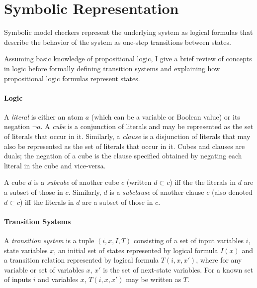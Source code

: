 \documentclass[12pt,a4paper,twoside,openright]{report}
\begin{document}
{\section{Symbolic Representation}
\label{prep:logic}

Symbolic model checkers represent the underlying system as
logical formulas that describe the behavior of the system as one-step transitions
between states. %

Assuming basic knowledge of propositional logic,
I give a brief review of concepts in logic before formally defining transition systems
and explaining how propositional logic formulas represent states.

\paragraph{Logic}{
A \emph{literal} is either an atom $a$ (which can
be a variable or Boolean value) or its negation $\neg a$.
A \emph{cube} is a conjunction of literals and may be represented as the set
of literals that occur in it. Similarly, a \emph{clause} is a disjunction of literals that
may also be represented as the set of literals that occur in it.
Cubes and clauses are duals; the negation of a cube is the
clause specified obtained by negating each literal in the cube
and vice-versa.

A cube $d$ is a \emph{subcube} of another cube $c$ (written $d \subset c$)
iff the the literals in $d$ are a subset of those in $c$.
Similarly, $d$ is a \emph{subclause} of another clause $c$ (also
denoted $d \subset c$) iff the literals in $d$ are a subset of those in $c$.}



\paragraph{Transition Systems}{
A \emph{transition system} is a tuple $(i,x,I,T)$ consisting of a set of input
variables $i$, state variables $x$, an initial
set of states represented by logical formula $I(x)$ and
a transition relation represented by logical formula $T(i,x,x')$,
where for any variable or set of variables $x$, $x'$ is the set of next-state variables. 
For a known set of inputs $i$ and variables $x$, $T(i,x,x')$ may be written
as $T$.

}}
\end{document}
